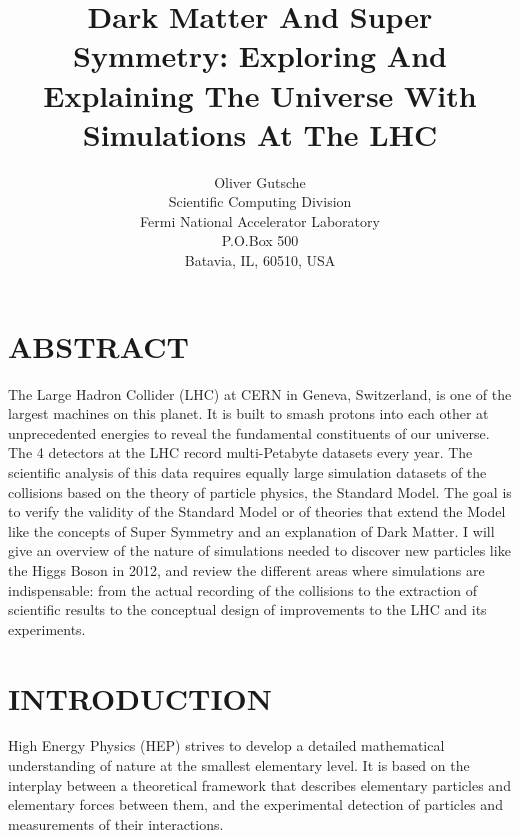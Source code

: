 \documentclass{wscpaperproc}
\theoremstyle{wsc}
\begin{document}
%
%

\title{Dark Matter And Super Symmetry: Exploring And Explaining The Universe With Simulations At The LHC}

\author{Oliver Gutsche\\ [12pt]
Scientific Computing Division \\
Fermi National Accelerator Laboratory\\
P.O.Box 500\\
Batavia, IL, 60510, USA\\
}

\maketitle

\section*{ABSTRACT}
The Large Hadron Collider (LHC) at CERN in Geneva, Switzerland, is one of the largest machines on this planet. It is built to smash protons into each other at unprecedented energies to reveal the fundamental constituents of our universe. The 4 detectors at the LHC record multi-Petabyte datasets every year. The scientific analysis of this data requires equally large simulation datasets of the collisions based on the theory of particle physics, the Standard Model. The goal is to verify the validity of the Standard Model or of theories that extend the Model like the concepts of Super Symmetry and an explanation of Dark Matter. I will give an overview of the nature of simulations needed to discover new particles like the Higgs Boson in 2012, and review the different areas where simulations are indispensable: from the actual recording of the collisions to the extraction of scientific results to the conceptual design of improvements to the LHC and its experiments.

\section{INTRODUCTION}
\label{sec:intro}
High Energy Physics (HEP) strives to develop a detailed mathematical understanding of nature at the smallest elementary level. It is based on the interplay between a theoretical framework that describes elementary particles and elementary forces between them, and the experimental detection of particles and measurements of their interactions.
\end{document}
